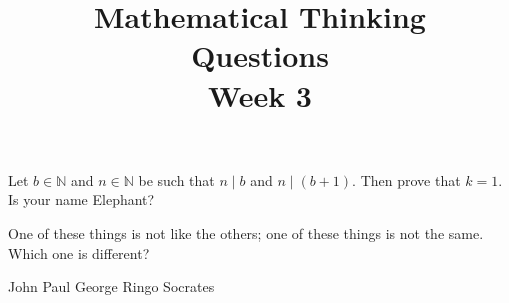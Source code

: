 \documentclass[12pt]{exam}
\title{\begin{framed}
    \textbf{Mathematical Thinking}\\Questions\\Week 3
\end{framed}}
\date{}
\begin{document}
\maketitle
\pointsinrightmargin
\begin{questions}
\question[1]  Let $b \in \mathbb{N}$ and $n \in \mathbb{N}$ be such that $n \mid b$ and $n \mid (b+1)$. Then prove that  $k=1$. 
\question[1] Is your name Elephant?
\question
One of these things is not like the others; one of these things is not
the same. Which one is different?
\begin{choices}
\choice John
\choice Paul
\choice George
\choice Ringo
\choice Socrates
\end{choices}
\end{questions}
\end{document}
